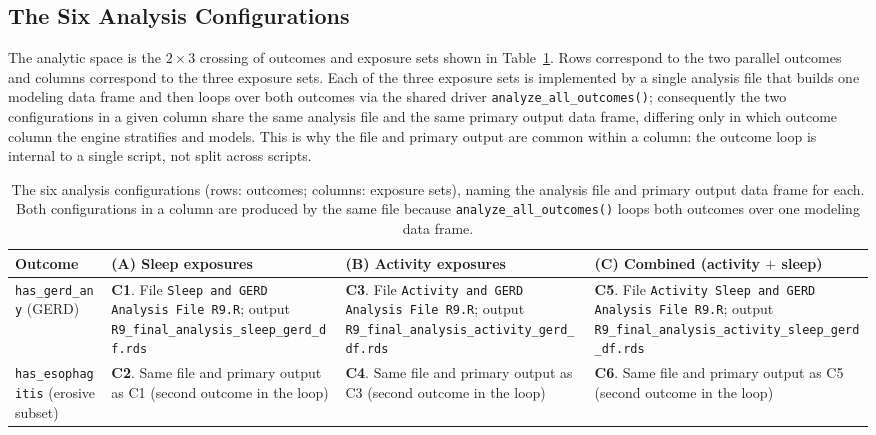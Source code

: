 \documentclass[11pt]{article}
\newcommand{\code}[1]{\texttt{\small #1}}
\begin{document}
\subsection{The Six Analysis Configurations}

The analytic space is the $2 \times 3$ crossing of outcomes and exposure sets shown in
Table~\ref{tab:six-configs}. Rows correspond to the two parallel outcomes and columns correspond to the
three exposure sets. Each of the three exposure sets is implemented by a single analysis file that
builds one modeling data frame and then loops over both outcomes via the shared driver
\code{analyze_all_outcomes()}; consequently the two configurations in a given column share the same
analysis file and the same primary output data frame, differing only in which outcome column the
engine strat\-ifies and models. This is why the file and primary output are common within a column:
the outcome loop is internal to a single script, not split across scripts.

\begin{table}[h]
\centering
\footnotesize
\begin{tabular}{@{}lp{3.6cm}p{3.6cm}p{3.6cm}@{}}
\toprule
Outcome & (A) Sleep exposures & (B) Activity exposures & (C) Combined (activity $+$ sleep) \\
\midrule
\code{has_gerd_any} \newline (GERD) &
\textbf{C1}. File \code{Sleep and GERD Analysis File R9.R}; output \code{R9_final_analysis_sleep_gerd_df.rds} &
\textbf{C3}. File \code{Activity and GERD Analysis File R9.R}; output \code{R9_final_analysis_activity_gerd_df.rds} &
\textbf{C5}. File \code{Activity Sleep and GERD Analysis File R9.R}; output \code{R9_final_analysis_activity_sleep_gerd_df.rds} \\
\addlinespace
\code{has_esophagitis} \newline (erosive subset) &
\textbf{C2}. Same file and primary output as C1 (second outcome in the loop) &
\textbf{C4}. Same file and primary output as C3 (second outcome in the loop) &
\textbf{C6}. Same file and primary output as C5 (second outcome in the loop) \\
\bottomrule
\end{tabular}
\caption{The six analysis configurations (rows: outcomes; columns: exposure sets), naming the
analysis file and primary output data frame for each. Both configurations in a column are produced by
the same file because \code{analyze_all_outcomes()} loops both outcomes over one modeling data frame.}
\label{tab:six-configs}
\end{table}
\end{document}
